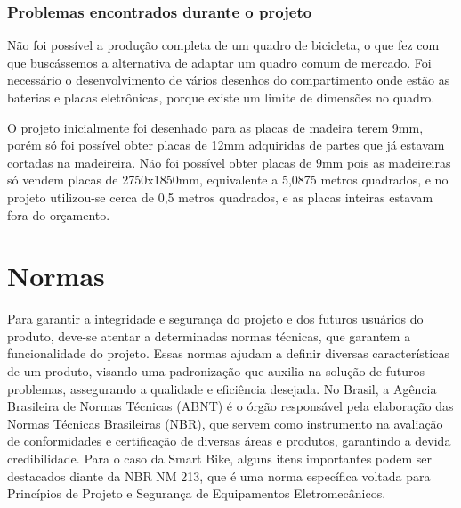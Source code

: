 		\subsubsection{Problemas encontrados durante o projeto}
		Não foi possível a produção completa de um quadro de bicicleta, o que fez com que buscássemos a alternativa de adaptar um quadro comum de mercado.  
		Foi necessário o desenvolvimento de vários desenhos do compartimento onde estão as baterias e placas eletrônicas, porque existe um limite de dimensões no quadro.
		
		O projeto inicialmente foi desenhado para as placas de madeira terem 9mm, porém só foi possível obter placas de 12mm adquiridas de partes que já estavam cortadas na madeireira. Não foi possível obter placas de 9mm pois as madeireiras só vendem placas de 2750x1850mm, equivalente a 5,0875 metros quadrados, e no projeto utilizou-se cerca de 0,5 metros quadrados, e as placas inteiras estavam fora do orçamento.


  \section{Normas}
  Para garantir a integridade e segurança do projeto e dos futuros usuários do produto, deve-se atentar a determinadas normas técnicas, que garantem a funcionalidade do projeto. Essas normas ajudam a definir diversas características de um produto, visando uma padronização que auxilia na solução de futuros problemas, assegurando a qualidade e eficiência desejada. No Brasil, a Agência Brasileira de Normas Técnicas (ABNT) é o órgão responsável pela elaboração das Normas Técnicas Brasileiras (NBR), que servem como instrumento na avaliação de conformidades e certificação de diversas áreas e produtos, garantindo a devida credibilidade. Para o caso da Smart Bike, alguns itens importantes podem ser destacados diante da NBR NM 213, que é uma norma específica voltada para Princípios de Projeto e Segurança de Equipamentos Eletromecânicos.
  


